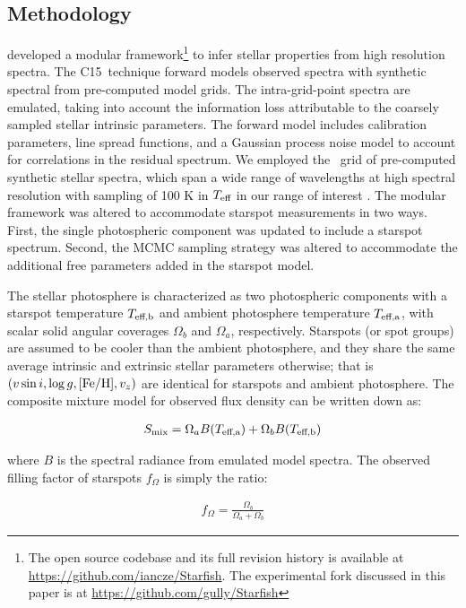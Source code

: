 \documentclass[twocolumn]{emulateapj}%
\newcommand{\iancze}{{\sc C15}}
\begin{document}
\subsection{Methodology}\label{sec:methods} 

\citet[hereafter \iancze]{czekala15} developed a modular framework\footnote{The open source codebase and its full revision history is available at \url{https://github.com/iancze/Starfish}.  The experimental fork discussed in this paper is at \url{https://github.com/gully/Starfish}} to infer stellar properties from high resolution spectra.  The \iancze\ technique forward models observed spectra with synthetic spectral from pre-computed model grids.  The intra-grid-point spectra are emulated, taking into account the information loss attributable to the coarsely sampled stellar intrinsic parameters.  The forward model includes calibration parameters, line spread functions, and a Gaussian process noise model to account for correlations in the residual spectrum.  We employed the \PHOENIX\ grid of pre-computed synthetic stellar spectra, which span a wide range of wavelengths at high spectral resolution with sampling of 100 K in $T_\textrm{eff}$ in our range of interest \citep{husser13}.  The modular framework was altered to accommodate starspot measurements in two ways. First, the single photospheric component was updated to include a starspot spectrum. Second, the MCMC sampling strategy was altered to accommodate the additional free parameters added in the starspot model.

The stellar photosphere is characterized as two photospheric components with a starspot temperature $T_\textrm{eff,b}$ and ambient photosphere temperature $T_\textrm{eff,a}$, with scalar solid angular coverages $\Omega_b$ and $\Omega_a$, respectively.    Starspots (or spot groups) are assumed to be cooler than the ambient photosphere, and they share the same average intrinsic and extrinsic stellar parameters otherwise; that is $(v \sin i, \log g, [{\rm Fe}/{\rm H}], v_z)$ are identical for starspots and ambient photosphere.  The composite mixture model for observed flux density can be written down as:

\begin{eqnarray} \label{eqn:mix_M}
S_{\mathrm{mix}} = \Omega_a B(T_\textrm{eff,a})  + \Omega_b B(T_\textrm{eff,b})
\end{eqnarray}

where $B$ is the spectral radiance from emulated model spectra.  The observed filling factor of starspots $f_{\Omega}$ is simply the ratio:

\begin{eqnarray} \label{eqn:fill_factor}
f_{\Omega} = \frac{\Omega_b}{\Omega_a + \Omega_b}
\end{eqnarray}
\end{document}
